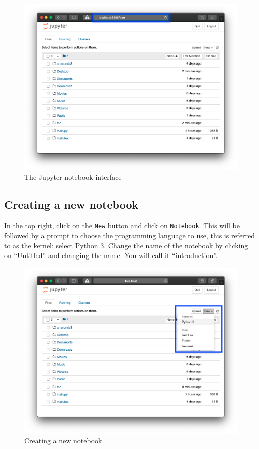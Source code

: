 \begin{figure}[htbp]
\centering
    \includegraphics[width=0.750\linewidth]{assets/the_jupyter_interface/main.png}
    \caption{The Jupyter notebook interface}
\end{figure}

\subsection{Creating a new notebook}
In the top right, click on the \texttt{New} button and click on
\texttt{Notebook}. This will be followed by a prompt to choose the programming
language to use, this is referred to as the kernel:
select Python 3.
Change the name of the notebook by clicking on ``Untitled'' and changing
the name. You will call it ``introduction''.

\begin{figure}[htbp]
\centering
    \includegraphics[width=0.750\linewidth]{assets/creating_a_new_notebook/main.png}
    \caption{Creating a new notebook}
\end{figure}

